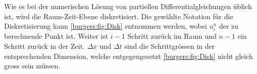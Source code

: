      Wie es bei der numerischen L\"osung von partiellen Differentialgleichungen \"ublich ist, wird die Raum-Zeit-Ebene  diskretisiert.
     Die gew\"ahlte Notation f\"ur die Diskretisierung kann \autoref{burgers:fig:Disk} entnommen werden, wobei $u_i^n$ der zu berechnende Punkt ist.
     Weiter ist $i-1$ Schritt zur\"uck im Raum und $n-1$ ein Schritt zur\"uck in der Zeit.
     $\Delta x$ und $\Delta t$ sind die Schrittgr\"ossen in der entsprechenden Dimension, welche entgegengesetzt \autoref{burgers:fig:Disk} nicht gleich gross sein m\"ussen.
